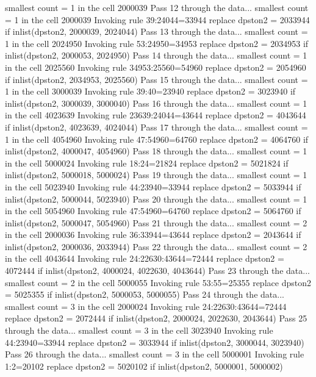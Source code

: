   smallest count = 1 in the cell      2000039
Pass 12 through the data...
  smallest count = 1 in the cell      2000039
  Invoking rule 39:24044=33944
  replace dpston2 = 2033944 if inlist(dpston2, 2000039, 2024044)
Pass 13 through the data...
  smallest count = 1 in the cell      2024950
  Invoking rule 53:24950=34953
  replace dpston2 = 2034953 if inlist(dpston2, 2000053, 2024950)
Pass 14 through the data...
  smallest count = 1 in the cell      2025560
  Invoking rule 34953:25560=54960
  replace dpston2 = 2054960 if inlist(dpston2, 2034953, 2025560)
Pass 15 through the data...
  smallest count = 1 in the cell      3000039
  Invoking rule 39:40=23940
  replace dpston2 = 3023940 if inlist(dpston2, 3000039, 3000040)
Pass 16 through the data...
  smallest count = 1 in the cell      4023639
  Invoking rule 23639:24044=43644
  replace dpston2 = 4043644 if inlist(dpston2, 4023639, 4024044)
Pass 17 through the data...
  smallest count = 1 in the cell      4054960
  Invoking rule 47:54960=64760
  replace dpston2 = 4064760 if inlist(dpston2, 4000047, 4054960)
Pass 18 through the data...
  smallest count = 1 in the cell      5000024
  Invoking rule 18:24=21824
  replace dpston2 = 5021824 if inlist(dpston2, 5000018, 5000024)
Pass 19 through the data...
  smallest count = 1 in the cell      5023940
  Invoking rule 44:23940=33944
  replace dpston2 = 5033944 if inlist(dpston2, 5000044, 5023940)
Pass 20 through the data...
  smallest count = 1 in the cell      5054960
  Invoking rule 47:54960=64760
  replace dpston2 = 5064760 if inlist(dpston2, 5000047, 5054960)
Pass 21 through the data...
  smallest count = 2 in the cell      2000036
  Invoking rule 36:33944=43644
  replace dpston2 = 2043644 if inlist(dpston2, 2000036, 2033944)
Pass 22 through the data...
  smallest count = 2 in the cell      4043644
  Invoking rule 24:22630:43644=72444
  replace dpston2 = 4072444 if inlist(dpston2, 4000024, 4022630, 4043644)
Pass 23 through the data...
  smallest count = 2 in the cell      5000055
  Invoking rule 53:55=25355
  replace dpston2 = 5025355 if inlist(dpston2, 5000053, 5000055)
Pass 24 through the data...
  smallest count = 3 in the cell      2000024
  Invoking rule 24:22630:43644=72444
  replace dpston2 = 2072444 if inlist(dpston2, 2000024, 2022630, 2043644)
Pass 25 through the data...
  smallest count = 3 in the cell      3023940
  Invoking rule 44:23940=33944
  replace dpston2 = 3033944 if inlist(dpston2, 3000044, 3023940)
Pass 26 through the data...
  smallest count = 3 in the cell      5000001
  Invoking rule 1:2=20102
  replace dpston2 = 5020102 if inlist(dpston2, 5000001, 5000002)
